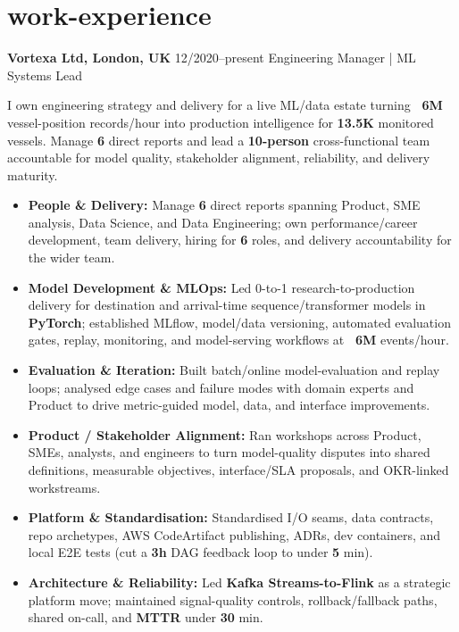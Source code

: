 \documentclass[]{../../friggeri-cv}
\renewcommand{\entry}[4]{%
  \parbox[t]{\dimexpr\textwidth-\entryleftinset\relax}{%
    \textbf{#2}%
    {\footnotesize\addfontfeature{Color=lightgray}\hspace{0.6em}#1}%
    \hfill%
    {\small\color{textcolor} #3}\\%
    #4\vspace{\parsep}%
  }\\}
\begin{document}
\section{work-experience}
\begin{entrylist}
    \entry
    {12/2020--present}
    {Vortexa Ltd, London, UK}
    {Engineering Manager | ML Systems Lead}
    {
        {\normalsize
        \setlength{\parindent}{0pt}
        \setlength{\leftskip}{0pt}
        I own engineering strategy and delivery for a live ML/data estate turning \textbf{~6M} vessel-position records/hour into production intelligence for \textbf{13.5K} monitored vessels. Manage \textbf{6} direct reports and lead a \textbf{10-person} cross-functional team accountable for model quality, stakeholder alignment, reliability, and delivery maturity.

        }
        \begin{itemize}[leftmargin=1.1em]
            \item \normalsize\textbf{People \& Delivery:} Manage \textbf{6} direct reports spanning Product, SME analysis, Data Science, and Data Engineering; own performance/career development, team delivery, hiring for \textbf{6} roles, and delivery accountability for the wider team.
            \item \normalsize\textbf{Model Development \& MLOps:} Led 0-to-1 research-to-production delivery for destination and arrival-time sequence/transformer models in \textbf{PyTorch}; established MLflow, model/data versioning, automated evaluation gates, replay, monitoring, and model-serving workflows at \textbf{~6M} events/hour.
            \item \normalsize\textbf{Evaluation \& Iteration:} Built batch/online model-evaluation and replay loops; analysed edge cases and failure modes with domain experts and Product to drive metric-guided model, data, and interface improvements.
            \item \normalsize\textbf{Product / Stakeholder Alignment:} Ran workshops across Product, SMEs, analysts, and engineers to turn model-quality disputes into shared definitions, measurable objectives, interface/SLA proposals, and OKR-linked workstreams.
            \item \normalsize\textbf{Platform \& Standardisation:} Standardised I/O seams, data contracts, repo archetypes, AWS CodeArtifact publishing, ADRs, dev containers, and local E2E tests (cut a \textbf{3h} DAG feedback loop to under \textbf{5} min).
            \item \normalsize\textbf{Architecture \& Reliability:} Led \textbf{Kafka Streams-to-Flink} as a strategic platform move; maintained signal-quality controls, rollback/fallback paths, shared on-call, and \textbf{MTTR} under \textbf{30} min.

\end{itemize}}
\end{entrylist}
\end{document}
